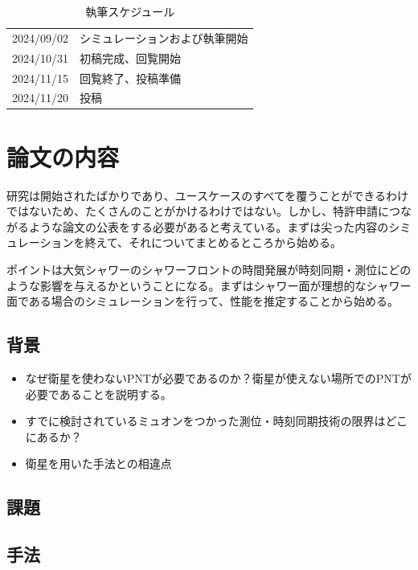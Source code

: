 \documentclass[uplatex]{jreport}
\begin{document}
\begin{table}[h]
   \centering
   \caption{執筆スケジュール}
   
   \begin{tabular}[t]{cl}
      \hline
      \hline
      2024/09/02 & シミュレーションおよび執筆開始 \\   
      2024/10/31 & 初稿完成、回覧開始 \\
      2024/11/15 & 回覧終了、投稿準備 \\
      2024/11/20 & 投稿 \\
      \hline
      \hline
   \end{tabular}
\end{table}

\section{論文の内容}
研究は開始されたばかりであり、ユースケースのすべてを覆うことができるわけではないため、たくさんのことがかけるわけではない。しかし、特許申請につながるような論文の公表をする必要があると考えている。まずは尖った内容のシミュレーションを終えて、それについてまとめるところから始める。

ポイントは大気シャワーのシャワーフロントの時間発展が時刻同期・測位にどのような影響を与えるかということになる。まずはシャワー面が理想的なシャワー面である場合のシミュレーションを行って、性能を推定することから始める。

\subsection*{背景}
\begin{itemize}
   \item なぜ衛星を使わないPNTが必要であるのか？衛星が使えない場所でのPNTが必要であることを説明する。
   \item すでに検討されているミュオンをつかった測位・時刻同期技術の限界はどこにあるか？
   \item 衛星を用いた手法との相違点
\end{itemize}




\subsection*{課題}

\subsection*{手法}
\end{document}
